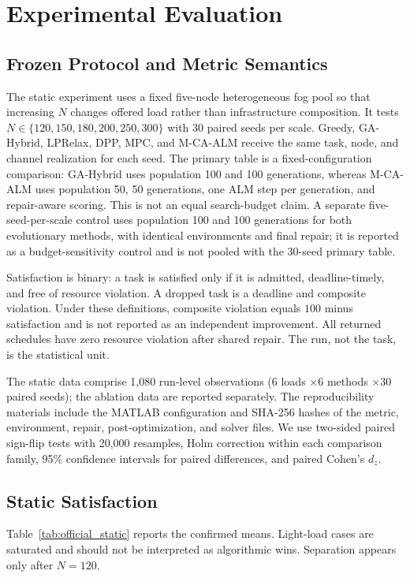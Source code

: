 \section{Experimental Evaluation}

\subsection{Frozen Protocol and Metric Semantics}
The static experiment uses a fixed five-node heterogeneous fog pool so that increasing $N$ changes offered load rather than infrastructure composition. It tests $N\in\{120,150,180,200,250,300\}$ with 30 paired seeds per scale. Greedy, GA-Hybrid, LPRelax, DPP, MPC, and M-CA-ALM receive the same task, node, and channel realization for each seed. The primary table is a fixed-configuration comparison: GA-Hybrid uses population 100 and 100 generations, whereas M-CA-ALM uses population 50, 50 generations, one ALM step per generation, and repair-aware scoring. This is not an equal search-budget claim. A separate five-seed-per-scale control uses population 100 and 100 generations for both evolutionary methods, with identical environments and final repair; it is reported as a budget-sensitivity control and is not pooled with the 30-seed primary table.

Satisfaction is binary: a task is satisfied only if it is admitted, deadline-timely, and free of resource violation. A dropped task is a deadline and composite violation. Under these definitions, composite violation equals $100$ minus satisfaction and is not reported as an independent improvement. All returned schedules have zero resource violation after shared repair. The run, not the task, is the statistical unit.

The static data comprise 1,080 run-level observations ($6$ loads $\times 6$ methods $\times 30$ paired seeds); the ablation data are reported separately. The reproducibility materials include the MATLAB configuration and SHA-256 hashes of the metric, environment, repair, post-optimization, and solver files. We use two-sided paired sign-flip tests with 20,000 resamples, Holm correction within each comparison family, 95\% confidence intervals for paired differences, and paired Cohen's $d_z$.

\subsection{Static Satisfaction}
Table~\ref{tab:official_static} reports the confirmed means. Light-load cases are saturated and should not be interpreted as algorithmic wins. Separation appears only after $N=120$.

